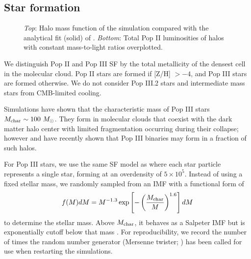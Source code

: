 \documentclass{PoS}
\begin{document}

\subsection{Star formation}

\begin{figure}
\caption{\label{fig:massfn} \textit{Top}: Halo mass function of the
  simulation compared with the analytical fit (solid) of
  \citet{Warren06}.  \textit{Bottom}: Total Pop II luminosities of
  halos with constant mass-to-light ratios overplotted.}
\end{figure}

We distinguish Pop II and Pop III SF by the total metallicity of the
densest cell in the molecular cloud.  Pop II stars are formed if [Z/H]
$> -4$, and Pop III stars are formed otherwise.  We do not consider
Pop III.2 stars and intermediate mass stars from CMB-limited cooling.

Simulations have shown that the characteristic mass of Pop III stars
$M_{\rm char} \sim 100~\Ms$.  They form in molecular clouds that
coexist with the dark matter halo center with limited fragmentation
occurring during their collapse; however \citet{2009Sci...325..601T}
and \citet{Stacy10_Binary} have recently shown that Pop III binaries
may form in a fraction of such halos.


For Pop III stars, we use the same SF model as \citet{Wise08_Gal} where
each star particle represents a single star, forming at an overdensity
of $5 \times 10^5$.  Instead of using a fixed stellar mass, we randomly
sampled from an IMF with a functional form of
%
\begin{equation}
\label{eqn:imf}
f(M)dM = M^{-1.3} \exp\left[-\left(\frac{M_{\rm
      char}}{M}\right)^{1.6}\right] dM
\end{equation}
to determine the stellar mass.  Above $M_{\rm char}$, it behaves as a
Salpeter IMF but is exponentially cutoff below that mass
\citep{Chabrier03, Clark09}.  For reproducibility, we record the number
of times the random number generator (Mersenne twister;
\citet{MTwister}) has been called for use when restarting the
simulations.
\end{document}
